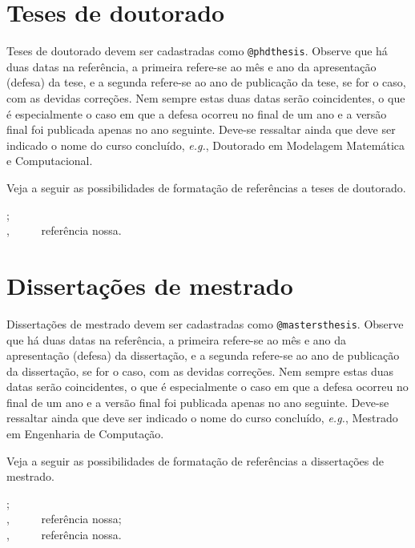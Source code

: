 \begin{apendicesenv}
\section{Teses de doutorado}
\label{sec:phdthesis}

Teses de doutorado devem ser cadastradas como \verb|@phdthesis|. Observe que há duas datas na referência, a primeira refere-se ao mês e ano da apresentação (defesa) da tese, e a segunda refere-se ao ano de publicação da tese, se for o caso, com as devidas correções. Nem sempre estas duas datas serão coincidentes, o que é especialmente o caso em que a defesa ocorreu no final de um ano e a versão final foi publicada apenas no ano seguinte. Deve-se ressaltar ainda que deve ser indicado o nome do curso concluído, \textit{e.g.}, Doutorado em Modelagem Matemática e Computacional.

Veja a seguir as possibilidades de formatação de referências a teses de doutorado.

{\small
    \cite{barcelos1998} ;\\
    \cite{Neubert2001} ,   \ \ \ \ \ referência nossa.\\
}



\section{Dissertações de mestrado}
\label{sec:mastersthesis}

Dissertações de mestrado devem ser cadastradas como \verb|@mastersthesis|. Observe que há duas datas na referência, a primeira refere-se ao mês e ano da apresentação (defesa) da dissertação, e a segunda refere-se ao ano de publicação da dissertação, se for o caso, com as devidas correções. Nem sempre estas duas datas serão coincidentes, o que é especialmente o caso em que a defesa ocorreu no final de um ano e a versão final foi publicada apenas no ano seguinte. Deve-se ressaltar ainda que deve ser indicado o nome do curso concluído, \textit{e.g.}, Mestrado em Engenharia de Computação.

Veja a seguir as possibilidades de formatação de referências a dissertações de mestrado.

{\small
    \cite{araujo1986} ;\\
    \cite{Santos2003} ,   \ \ \ \ \ referência nossa;\\
    \cite{Souza2012} ,   \ \ \ \ \ referência nossa.\\
}




\end{apendicesenv}
